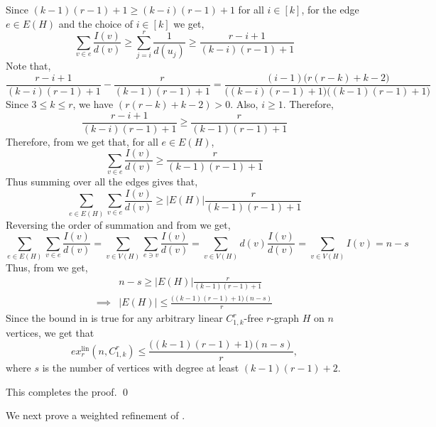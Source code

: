 \documentclass[12pt]{article}
\begin{document}
Since $(k-1)(r-1)+1 \geq (k-i)(r-1)+1$ for all $ i\in [k]$, for the edge $e\in E(H)$ and the choice of $i \in [k]$ we get,
\begin{equation}\label{eqn2}
    \sum_{v \in e} \frac{I(v)}{d(v)} \geq \sum_{j=i}^r\frac{1}{d(u_j)} \geq \frac{r-i+1}{(k-i)(r-1)+1}
\end{equation}
Note that, 
\begin{equation*}
    \frac{r-i+1}{(k-i)(r-1)+1} - \frac{r}{(k-1)(r-1)+1} = \frac{(i-1)\big(r(r-k)+k-2\big)}{\big((k-i)(r-1)+1\big)\big((k-1)(r-1)+1\big)}
\end{equation*}
Since $3\leq k \leq r$, we have $(r(r-k)+k-2) > 0$. Also, $i \geq 1$. Therefore,
\begin{equation}\label{eqn3}
    \frac{r-i+1}{(k-i)(r-1)+1} \geq \frac{r}{(k-1)(r-1)+1}
\end{equation}
Therefore, from  we get that, for all $e \in E(H)$,
\begin{equation*}
    \sum_{v \in e}\frac{I(v)}{d(v)} \geq \frac{r}{(k-1)(r-1)+1}
\end{equation*}
Thus summing over all the edges gives that,
\begin{equation}\label{eqn4}
    \sum_{e \in E(H)}\sum_{v \in e}\frac{I(v)}{d(v)} \geq |E(H)|\frac{r}{(k-1)(r-1)+1}
\end{equation}
Reversing the order of summation and from  we get,
\begin{equation}\label{eqn5}
     \sum_{e \in E(H)}\sum_{v \in e}\frac{I(v)}{d(v)} =\sum_{v \in V(H)} \sum_{e \ni v}\frac{I(v)}{d(v)} = \sum_{v \in V(H)} d(v) \frac{I(v)}{d(v)} =  \sum_{v \in V(H)}I(v) = n-s
\end{equation}
Thus, from  we get,
\begin{align}
    &n-s \geq |E(H)|\frac{r}{(k-1)(r-1)+1}\nonumber\\
    \implies & |E(H)| \leq \frac{\big((k-1)(r-1)+1\big)(n-s)}{r}\label{eqn6}
\end{align}
Since the bound in  is true for any arbitrary linear $C_{1,k}^r$-free $r$-graph $H$ on $n$ vertices, we get that
$$ex_r^{\mathrm{lin}}(n,C^r_{1,k}) \leq \frac{\big((k-1)(r-1)+1\big)(n-s)}{r},$$
    where $s$ is the number of vertices with degree at least $(k-1)(r-1) +2$. 

    This completes the proof. \qed
\vspace{2mm}

We next prove a weighted refinement of .
\end{document}
